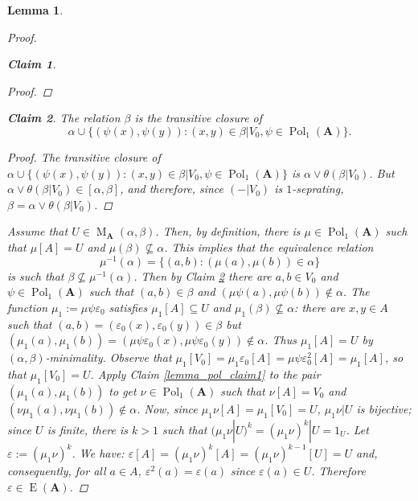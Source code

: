 \documentclass{amsart}
\theoremstyle{plain}
\newtheorem{lemma}[theorem]{Lemma}
\newtheorem{claim}{Claim}
\theoremstyle{definition}
\theoremstyle{remark}
\def\epsilon{\varepsilon}
\DeclareMathOperator{\Pol}{Pol}
\DeclareMathOperator{\Id}{E}
\DeclareMathOperator{\M}{M}
\begin{document}
\begin{lemma}
\begin{proof}
\begin{claim}
\begin{proof}
            \end{proof}
        \end{claim}
        \begin{claim}
            \label{lemma_pol_claim2}
            The relation $\beta$ is the transitive closure of 
            \begin{equation*}
                \alpha \cup \{(\psi(x), \psi(y)) : (x,y) \in \beta|V_0, \psi \in \Pol_1(\mathbf{A})\} \text{.}
            \end{equation*}
            \begin{proof}
                The transitive closure of $\alpha \cup \{(\psi(x), \psi(y)) : (x,y) \in \beta|V_0, \psi \in \Pol_1(\mathbf{A})\}$ is $\alpha \lor \theta(\beta|V_0)$. 
                But $\alpha \lor \theta(\beta|V_0) \in [\alpha, \beta]$, and therefore, since $(-|V_0)$ is $1$-seprating, $\beta=\alpha \lor \theta(\beta|V_0)$. 
            \end{proof}
        \end{claim}
        Assume that $U \in \M_{\mathbf{A}}(\alpha, \beta)$. 
        Then, by definition, there is $\mu \in \Pol_1(\mathbf{A})$ such that $\mu[A] =U$ and $\mu(\beta) \nsubseteq \alpha$. 
        This implies that the equivalence relation 
        \begin{equation*}
            \mu^{-1}(\alpha)=\{(a,b): (\mu(a), \mu(b)) \in \alpha\} 
        \end{equation*}
        is such that $\beta \nsubseteq \mu^{-1}(\alpha)$. 
        Then by Claim \ref{lemma_pol_claim2} there are $a,b \in V_0$ and $\psi \in \Pol_1(\mathbf{A})$ such that $(a,b) \in \beta$ and $(\mu \psi(a), \mu \psi(b)) \notin \alpha$. 
        The function $\mu_1:=\mu \psi \epsilon_0$ satisfies $\mu_1[A] \subseteq U$ and $\mu_1(\beta) \nsubseteq \alpha$: 
        there are $x,y \in A$ such that $(a,b)=(\epsilon_0(x), \epsilon_0(y)) \in \beta $ but $(\mu_1(a), \mu_1(b))=(\mu \psi \epsilon_0(x), \mu \psi \epsilon_0(y)) \notin \alpha$. 
        Thus $\mu_1[A] = U$ by $(\alpha, \beta)$-minimality. 
        Observe that $\mu_1[V_0]=\mu_1 \epsilon_0 [A] = \mu \psi \epsilon^2_0[A] = \mu_1[A]$, so that $\mu_1[V_0] = U$. 
        Apply Claim \ref{lemma_pol_claim1} to the pair $(\mu_1(a), \mu_1(b))$ to get $\nu \in \Pol_1(\mathbf{A})$ such that $\nu[A]=V_0$ and $(\nu \mu_1(a), \nu \mu_1(b)) \notin \alpha$. 
        Now, since $\mu_1 \nu [A] = \mu_1[V_0] = U$, 
        $\mu_1 \nu | U $ is bijective; since $U$ is finite, there is $k >1$ such that $(\mu_1 \nu |U )^k = (\mu_1 \nu)^k |U =1_U$. 
        Let $\epsilon:=(\mu_1 \nu)^k$.
        We have: $\epsilon[A] = (\mu_1 \nu)^k[A]=(\mu_1 \nu)^{k-1}[U]=U$ and, consequently, for all $a \in A$, $\epsilon^2(a)=\epsilon(a)$ since $\epsilon(a) \in U$. 
        Therefore $\epsilon \in \Id(\mathbf{A})$. 
    \end{proof}
\end{lemma}
\end{document}
